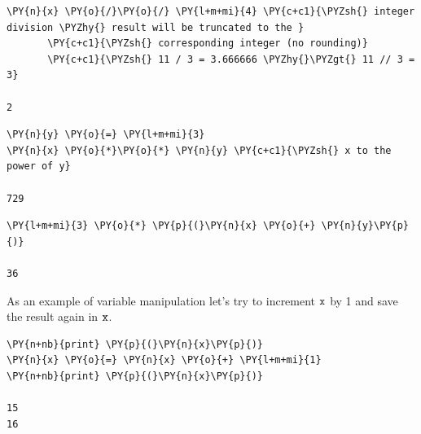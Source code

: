 \begin{tcolorbox}[breakable, size=fbox, boxrule=1pt, pad at break*=1mm, colback=cellbackground, colframe=cellborder]            
\begin{Verbatim}[commandchars=\\\{\}]
\PY{n}{x} \PY{o}{/}\PY{o}{/} \PY{l+m+mi}{4} \PY{c+c1}{\PYZsh{} integer division \PYZhy{} result will be truncated to the }
       \PY{c+c1}{\PYZsh{} corresponding integer (no rounding)}
       \PY{c+c1}{\PYZsh{} 11 / 3 = 3.666666 \PYZhy{}\PYZgt{} 11 // 3 = 3}

2
\end{Verbatim}
\end{tcolorbox}

\begin{tcolorbox}[breakable, size=fbox, boxrule=1pt, pad at break*=1mm, colback=cellbackground, colframe=cellborder]            
\begin{Verbatim}[commandchars=\\\{\}]
\PY{n}{y} \PY{o}{=} \PY{l+m+mi}{3}
\PY{n}{x} \PY{o}{*}\PY{o}{*} \PY{n}{y} \PY{c+c1}{\PYZsh{} x to the power of y}

729
\end{Verbatim}
\end{tcolorbox}

\begin{tcolorbox}[breakable, size=fbox, boxrule=1pt, pad at break*=1mm, colback=cellbackground, colframe=cellborder]            
\begin{Verbatim}[commandchars=\\\{\}]
\PY{l+m+mi}{3} \PY{o}{*} \PY{p}{(}\PY{n}{x} \PY{o}{+} \PY{n}{y}\PY{p}{)}

36
\end{Verbatim}
\end{tcolorbox}

As an example of variable manipulation let's try to increment \(\tt{x}\) by 1 and save the result again in \(\tt{x}\).

\begin{tcolorbox}[breakable, size=fbox, boxrule=1pt, pad at break*=1mm, colback=cellbackground, colframe=cellborder]            
\begin{Verbatim}[commandchars=\\\{\}]
\PY{n+nb}{print} \PY{p}{(}\PY{n}{x}\PY{p}{)}
\PY{n}{x} \PY{o}{=} \PY{n}{x} \PY{o}{+} \PY{l+m+mi}{1}
\PY{n+nb}{print} \PY{p}{(}\PY{n}{x}\PY{p}{)}

15
16
\end{Verbatim}
\end{tcolorbox}

